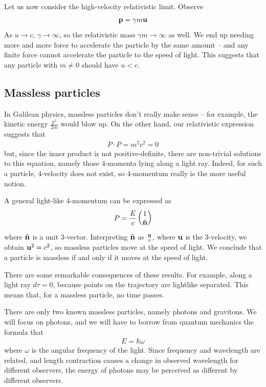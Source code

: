 \documentclass{../../template/note}
\begin{document}
    Let us now consider the high-velocity relativistic limit. Observe
    \begin{align*}
        \V p = \gamma m \V u
    \end{align*}
    As \(u \to c\), \(\gamma \to \infty\), so the relativistic mass \(\gamma m \to \infty\) as well. We end up needing more and more force to accelerate the particle by the same amount -- and any finite force cannot accelerate the particle to the speed of light. This suggests that any particle with \(m \neq 0\) should have \(u < c\).
    
    \subsection{Massless particles}

    In Galilean physics, massless particles don't really make sense -- for example, the kinetic energy \(\frac{p^2}{2m}\) would blow up. On the other hand, our relativistic expression suggests that
    \begin{align*}
        P \cdot P = m^2c^2 = 0
    \end{align*}
    but, since the inner product is not positive-definite, there are non-trivial solutions to this equation, namely those 4-momenta lying along a light ray. Indeed, for such a particle, 4-velocity does not exist, so 4-momentum really is the more useful notion.

    A general light-like 4-momentum can be expressed as
    \begin{align*}
        P = \frac E c\begin{pmatrix}
            1 \\
            \hvec n \\
        \end{pmatrix}
    \end{align*}
    where \(\hvec n\) is a unit 3-vector. Interpreting \(\hvec n\) as \(\frac{\V u}c\), where \(\V u\) is the 3-velocity, we obtain \(\V u^2 = c^2\), so massless particles move at the speed of light. We conclude that a particle is massless if and only if it moves at the speed of light.

    There are some remarkable consequences of these results. For example, along a light ray \(d\tau = 0\), because points on the trajectory are lightlike separated. This means that, for a massless particle, no time passes.

    There are only two known massless particles, namely photons and gravitons. We will focus on photons, and we will have to borrow from quantum mechanics the formula that
    \begin{align*}
        E = \hbar \omega
    \end{align*}
    where \(\omega\) is the angular frequency of the light. Since frequency and wavelength are related, and length contraction causes a change in observed wavelength for different observers, the energy of photons may be perceived as different by different observers.
\end{document}

